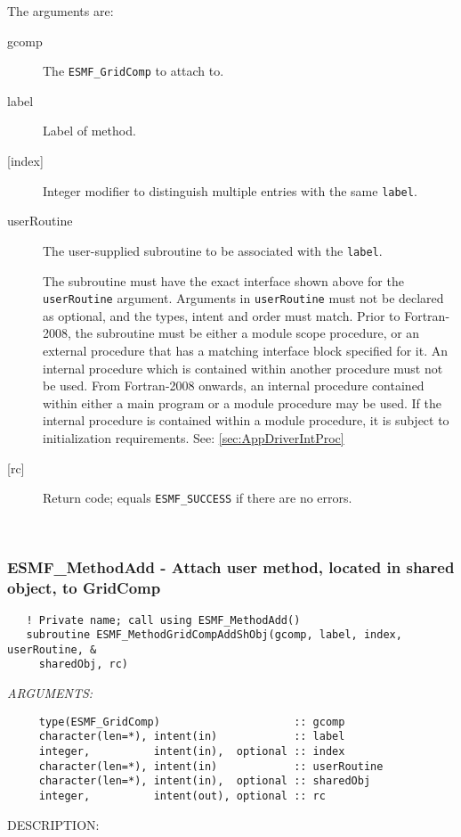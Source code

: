    The arguments are:
   \begin{description}
   \item[gcomp]
     The {\tt ESMF\_GridComp} to attach to.
   \item[label]
     Label of method.
   \item[{[index]}]
     Integer modifier to distinguish multiple entries with the same {\tt label}.
   \item[userRoutine]
     The user-supplied subroutine to be associated with the {\tt label}.
  
     The subroutine must have the exact interface shown above
     for the {\tt userRoutine} argument. Arguments in {\tt userRoutine}
     must not be declared as optional, and the types, intent and order must
     match.
     Prior to Fortran-2008, the subroutine must be either a module scope procedure,
     or an external procedure that has a matching interface block specified for it.
     An internal procedure which is contained within another procedure must not be used.
     From Fortran-2008 onwards, an internal procedure contained within either a main program
     or a module procedure may be used.  If the internal procedure is contained within a
     module procedure, it is subject to initialization requirements.  See: \ref{sec:AppDriverIntProc}
   \item[{[rc]}]
     Return code; equals {\tt ESMF\_SUCCESS} if there are no errors.
   \end{description}
   
 
\mbox{}\hrulefill\ 
 
\subsubsection [ESMF\_MethodAdd] {ESMF\_MethodAdd - Attach user method, located in shared object, to GridComp}


  
\begin{verbatim}   ! Private name; call using ESMF_MethodAdd()
   subroutine ESMF_MethodGridCompAddShObj(gcomp, label, index, userRoutine, &
     sharedObj, rc)\end{verbatim}{\em ARGUMENTS:}
\begin{verbatim}     type(ESMF_GridComp)                     :: gcomp
     character(len=*), intent(in)            :: label
     integer,          intent(in),  optional :: index
     character(len=*), intent(in)            :: userRoutine
     character(len=*), intent(in),  optional :: sharedObj
     integer,          intent(out), optional :: rc \end{verbatim}
{\sf DESCRIPTION:\\ }


